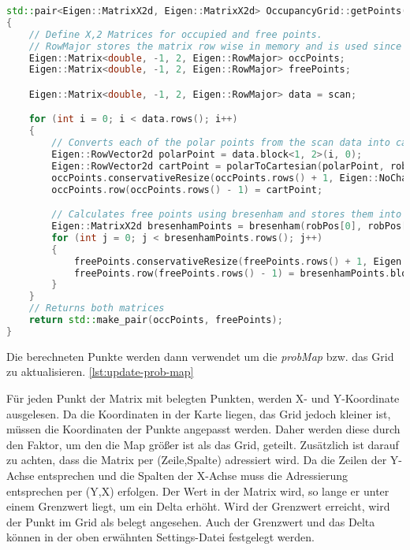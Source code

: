 \begin{lstlisting}[caption={Berechnung occPoints und freePoints},label={lst:getPoints},language={C++}]
std::pair<Eigen::MatrixX2d, Eigen::MatrixX2d> OccupancyGrid::getPoints(const Eigen::MatrixX2d &scan, const Eigen::RowVector2d &robPos, double robRotAngle)
{
    // Define X,2 Matrices for occupied and free points.
    // RowMajor stores the matrix row wise in memory and is used since each point is represented by one row in the matrix.
    Eigen::Matrix<double, -1, 2, Eigen::RowMajor> occPoints;
    Eigen::Matrix<double, -1, 2, Eigen::RowMajor> freePoints;

    Eigen::Matrix<double, -1, 2, Eigen::RowMajor> data = scan;

    for (int i = 0; i < data.rows(); i++)
    {
        // Converts each of the polar points from the scan data into cartesian and stores it in occPoints
        Eigen::RowVector2d polarPoint = data.block<1, 2>(i, 0);
        Eigen::RowVector2d cartPoint = polarToCartesian(polarPoint, robPos, robRotAngle);
        occPoints.conservativeResize(occPoints.rows() + 1, Eigen::NoChange);
        occPoints.row(occPoints.rows() - 1) = cartPoint;

        // Calculates free points using bresenham and stores them into freePoints
        Eigen::MatrixX2d bresenhamPoints = bresenham(robPos[0], robPos[1], cartPoint[0], cartPoint[1]);
        for (int j = 0; j < bresenhamPoints.rows(); j++)
        {
            freePoints.conservativeResize(freePoints.rows() + 1, Eigen::NoChange);
            freePoints.row(freePoints.rows() - 1) = bresenhamPoints.block<1, 2>(j, 0);
        }
    }
    // Returns both matrices
    return std::make_pair(occPoints, freePoints);
}
\end{lstlisting}

Die berechneten Punkte werden dann verwendet um die \textit{probMap} bzw. das Grid zu aktualisieren. \ref{lst:update-prob-map}

Für jeden Punkt der Matrix mit belegten Punkten, werden X- und Y-Koordinate ausgelesen.
Da die Koordinaten in der Karte liegen, das Grid jedoch kleiner ist, müssen die Koordinaten der Punkte angepasst werden.
Daher werden diese durch den Faktor, um den die Map größer ist als das Grid, geteilt.
Zusätzlich ist darauf zu achten, dass die Matrix per (Zeile,Spalte) adressiert wird.
Da die Zeilen der Y-Achse entsprechen und die Spalten der X-Achse muss die Adressierung entsprechen per (Y,X) erfolgen.
Der Wert in der Matrix wird, so lange er unter einem Grenzwert liegt, um ein Delta erhöht.
Wird der Grenzwert erreicht, wird der Punkt im Grid als belegt angesehen.
Auch der Grenzwert und das Delta können in der oben erwähnten Settings-Datei festgelegt werden.

